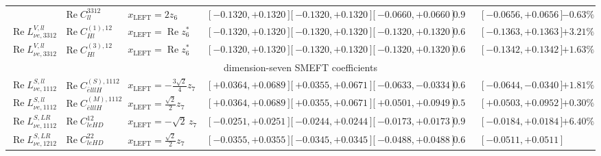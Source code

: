 \begin{table}[htbp]
{\begin{tabular}{lllllllll}
        & \(\operatorname{Re}C_{ll}^{3312}\)
        & \(x_{\mathrm{LEFT}}=2z_6\)
        & \([-0.1320,+0.1320]\)
        & \([-0.1320,+0.1320]\)
        & \([-0.0660,+0.0660]\)
        & \(0.958\)
        & \([-0.0656,+0.0656]\)
        & \(-0.63\%\)
        \\
        \(\operatorname{Re}L_{\nu e,3312}^{V,ll}\)
        & \(\operatorname{Re}C_{Hl}^{(1),12}\)
        & \(x_{\mathrm{LEFT}}=\operatorname{Re}z_6^\ast\)
        & \([-0.1320,+0.1320]\)
        & \([-0.1320,+0.1320]\)
        & \([-0.1320,+0.1320]\)
        & \(0.678\)
        & \([-0.1363,+0.1363]\)
        & \(+3.21\%\)
        \\
        \(\operatorname{Re}L_{\nu e,3312}^{V,ll}\)
        & \(\operatorname{Re}C_{Hl}^{(3),12}\)
        & \(x_{\mathrm{LEFT}}=\operatorname{Re}z_6^\ast\)
        & \([-0.1320,+0.1320]\)
        & \([-0.1320,+0.1320]\)
        & \([-0.1320,+0.1320]\)
        & \(0.678\)
        & \([-0.1342,+0.1342]\)
        & \(+1.63\%\)
        \\
        \midrule
        \multicolumn{9}{c}{dimension-seven SMEFT coefficients}\\
        \midrule
        \(\operatorname{Re}L_{\nu e,1112}^{S,ll}\)
        & \(\operatorname{Re}C_{\bar e lllH}^{(S),1112}\)
        & \(x_{\mathrm{LEFT}}=-\frac{3\sqrt2}{4}z_7\)
        & \([+0.0364,+0.0689]\)
        & \([+0.0355,+0.0671]\)
        & \([-0.0633,-0.0334]\)
        & \(0.618\)
        & \([-0.0644,-0.0340]\)
        & \(+1.81\%\)
        \\
        \(\operatorname{Re}L_{\nu e,1112}^{S,ll}\)
        & \(\operatorname{Re}C_{\bar e lllH}^{(M),1112}\)
        & \(x_{\mathrm{LEFT}}=\frac{\sqrt2}{2}z_7\)
        & \([+0.0364,+0.0689]\)
        & \([+0.0355,+0.0671]\)
        & \([+0.0501,+0.0949]\)
        & \(0.540\)
        & \([+0.0503,+0.0952]\)
        & \(+0.30\%\)
        \\
        \(\operatorname{Re}L_{\nu e,1112}^{S,LR}\)
        & \(\operatorname{Re}C_{leHD}^{12}\)
        & \(x_{\mathrm{LEFT}}=-\sqrt2\,z_7\)
        & \([-0.0251,+0.0251]\)
        & \([-0.0244,+0.0244]\)
        & \([-0.0173,+0.0173]\)
        & \(0.953\)
        & \([-0.0184,+0.0184]\)
        & \(+6.40\%\)
        \\
        \(\operatorname{Re}L_{\nu e,1212}^{S,LR}\)
        & \(\operatorname{Re}C_{leHD}^{22}\)
        & \(x_{\mathrm{LEFT}}=\frac{\sqrt2}{2}z_7\)
        & \([-0.0355,+0.0355]\)
        & \([-0.0345,+0.0345]\)
        & \([-0.0488,+0.0488]\)
        & \(0.674\)
        & \([-0.0511,+0.0511]\)

\end{tabular}}
\end{table}

